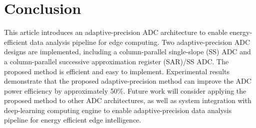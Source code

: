 \section{Conclusion}\label{conclusion}

This article introduces an adaptive-precision ADC architecture to enable energy-efficient 
data analysis pipeline for edge computing. Two adaptive-precision ADC designs are implemented, 
including a column-parallel single-slope (SS) ADC and a column-parallel successive approximation 
register (SAR)/SS ADC. The proposed method is efficient and easy to implement. Experimental results 
demonstrate that the proposed adaptive-precision method can improve the ADC power efficiency by 
approximately 50\%. Future work will consider applying the proposed method to other ADC architectures, 
as well as system integration with deep-learning computing engine to enable adaptive-precision
data analysis pipeline for energy efficient edge intelligence. 

